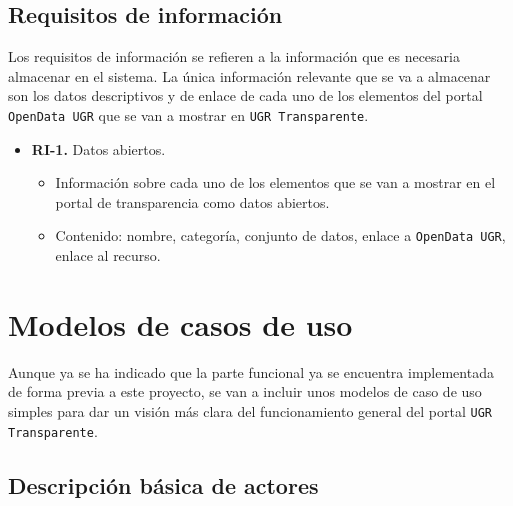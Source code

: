 \subsection{Requisitos de información}

Los requisitos de información se refieren a la información que es necesaria almacenar en el sistema. La única información relevante que se va a almacenar son los datos descriptivos y de enlace de cada uno de los elementos del portal {\tt OpenData UGR} que se van a mostrar en {\tt UGR Transparente}.

\begin{itemize}
  \item \textbf{RI-1.} Datos abiertos.
  \begin{itemize}
    \item Información sobre cada uno de los elementos que se van a mostrar en el portal de transparencia como datos abiertos.
    \item Contenido: nombre, categoría, conjunto de datos, enlace a {\tt OpenData UGR}, enlace al recurso.
  \end{itemize}
\end{itemize}

\section{Modelos de casos de uso}

Aunque ya se ha indicado que la parte funcional ya se encuentra implementada de forma previa a este proyecto, se van a incluir unos modelos de caso de uso simples para dar un visión más clara del funcionamiento general del portal {\tt UGR Transparente}.

\subsection{Descripción básica de actores}

